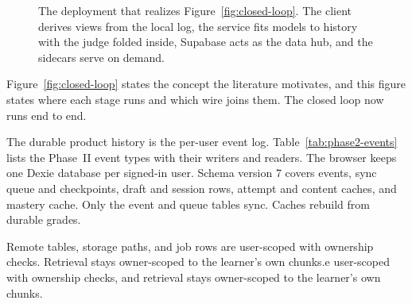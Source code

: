 \begin{figure}[htbp]
\centering
{}
\caption{The deployment that realizes Figure~\ref{fig:closed-loop}. The client derives views from the local log, the service fits models to history with the judge folded inside, Supabase acts as the data hub, and the sidecars serve on demand.}
\label{fig:architecture}
\end{figure}

Figure~\ref{fig:closed-loop} states the concept the literature motivates, and this figure states where each stage runs and which wire joins them. The closed loop now runs end to end.

The durable product history is the per-user event log. Table~\ref{tab:phase2-events} lists the Phase~II event types with their writers and readers. The browser keeps one Dexie database per signed-in user. Schema version 7 covers events, sync queue and checkpoints, draft and session rows, attempt and content caches, and mastery cache. Only the event and queue tables sync. Caches rebuild from durable grades.

Remote tables, storage paths, and job rows are user-scoped with ownership checks. Retrieval stays owner-scoped to the learner's own chunks.e user-scoped with ownership checks, and retrieval stays owner-scoped to the learner's own chunks.


